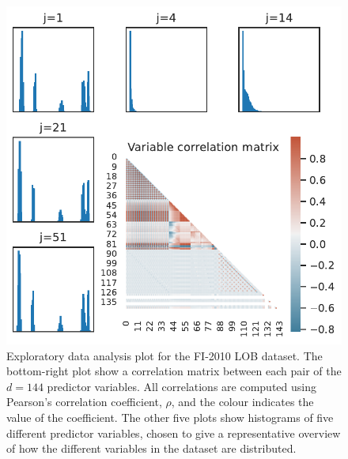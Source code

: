 \documentclass{statsmsc}
\begin{document}
{%
\begin{figure}
    \begin{center}
        \includegraphics[scale=1]{figures/lob_data_eda_plot.pdf}
    \end{center}
    \caption{
        Exploratory data analysis plot for the FI-2010 \ac{LOB} dataset.
        The bottom-right plot show a correlation matrix between each pair
        of the $d=144$ predictor variables. All correlations are computed using
        Pearson's correlation coefficient, $\rho$, and the colour indicates the
        value of the coefficient.  The other five plots show histograms of five
        different predictor variables, chosen to give a representative overview of
        how the different variables in the dataset are distributed.
    }
    \label{fig:lob_eda}
\end{figure}


}
\end{document}
